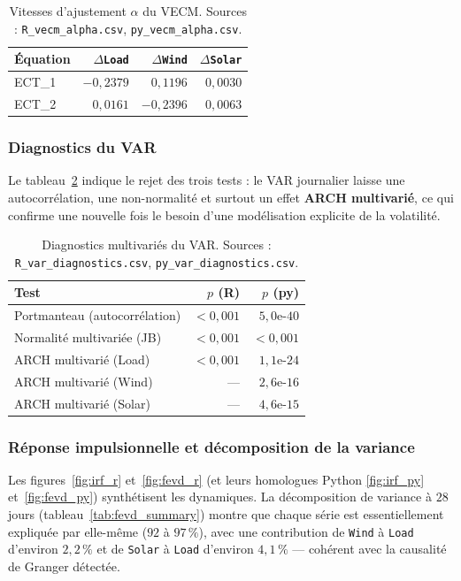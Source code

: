 \begin{table}[H]
\centering
\caption{Vitesses d'ajustement $\alpha$ du VECM.
Sources : \texttt{R\_vecm\_alpha.csv}, \texttt{py\_vecm\_alpha.csv}.}
\label{tab:vecm_alpha}
\small
\begin{tabular}{lrrr}
\toprule
Équation & $\Delta$\texttt{Load} & $\Delta$\texttt{Wind} & $\Delta$\texttt{Solar} \\
\midrule
ECT\_1 & $-0{,}2379$ & $0{,}1196$ & $0{,}0030$ \\
ECT\_2 & $0{,}0161$ & $-0{,}2396$ & $0{,}0063$ \\
\bottomrule
\end{tabular}
\end{table}

\subsubsection{Diagnostics du VAR}
Le tableau~\ref{tab:var_diag} indique le rejet des trois tests : le VAR
journalier laisse une autocorrélation, une non-normalité et surtout un effet
\textbf{ARCH multivarié}, ce qui confirme une nouvelle fois le besoin d'une
modélisation explicite de la volatilité.

\begin{table}[H]
\centering
\caption{Diagnostics multivariés du VAR. Sources :
\texttt{R\_var\_diagnostics.csv}, \texttt{py\_var\_diagnostics.csv}.}
\label{tab:var_diag}
\small
\begin{tabular}{lrr}
\toprule
Test & $p$ (R) & $p$ (py) \\
\midrule
Portmanteau (autocorrélation) & $<0{,}001$ & $5{,}0\text{e-}40$ \\
Normalité multivariée (JB) & $<0{,}001$ & $<0{,}001$ \\
ARCH multivarié (Load) & $<0{,}001$ & $1{,}1\text{e-}24$ \\
ARCH multivarié (Wind) & --- & $2{,}6\text{e-}16$ \\
ARCH multivarié (Solar) & --- & $4{,}6\text{e-}15$ \\
\bottomrule
\end{tabular}
\end{table}

\subsubsection{Réponse impulsionnelle et décomposition de la variance}
Les figures~\ref{fig:irf_r} et~\ref{fig:fevd_r} (et leurs homologues Python
\ref{fig:irf_py} et~\ref{fig:fevd_py}) synthétisent les dynamiques. La
décomposition de variance à \(28\) jours (tableau~\ref{tab:fevd_summary})
montre que chaque série est essentiellement expliquée par elle-même
(\(92\) à \(97\,\%\)), avec une contribution de \texttt{Wind} à \texttt{Load}
d'environ \(2{,}2\,\%\) et de \texttt{Solar} à \texttt{Load} d'environ
\(4{,}1\,\%\) --- cohérent avec la causalité de Granger détectée.

